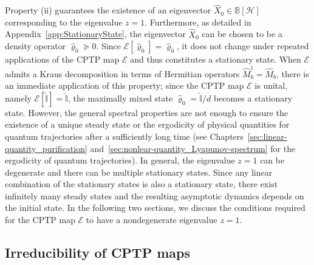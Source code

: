 \documentclass[preprint,pteplogo]{ptephy_v2}%
\numberwithin{equation}{section}
\theoremstyle{definition}
\newcommand{\mc}[1]{\mathcal{#1}}
\newcommand{\mbb}[1]{\mathbb{#1}}
\begin{document}
Property (ii) guarantees the existence of an eigenvector $\hat{X}_0 \in \mbb{B}[\mc{H}]$ corresponding to the eigenvalue $z=1$.
Furthermore, as detailed in Appendix~\ref{app:StationaryState}, the eigenvector $\hat{X}_0$ can be chosen to be a density operator $\hat{\varrho}_0 \succeq 0$. 
Since $\mc{E}[\hat{\varrho}_0]=\hat{\varrho}_0$, it does not change under repeated applications of the CPTP map $\mc{E}$ and thus constitutes a stationary state.
When $\mc{E}$ admits a Kraus decomposition in terms of Hermitian operators $\hat{M}_b^\dagger = \hat{M}_b$, there is an immediate application of this property; since the CPTP map $\mc{E}$ is unital, namely $\mc{E}[\hat{\mbb{I}}] = \hat{\mbb{I}}$, the maximally mixed state $\hat{\varrho}_0 = \hat{\mbb{I}}/d$ becomes a stationary state.
However, the general spectral properties are not enough to ensure the existence of a unique steady state or the ergodicity of physical quantities for quantum trajectories after a sufficiently long time (see Chapters~\ref{sec:linear-quantity_purification} and~\ref{sec:nonlear-quantity_Lyapunov-spectrum} for the ergodicity of quantum trajectories).
In general, the eigenvalue $z=1$ can be degenerate and there can be multiple stationary states. 
Since any linear combination of the stationary states is also a stationary state, there exist infinitely many steady states and the resulting asymptotic dynamics depends on the initial state.
In the following two sections, we discuss the conditions required for the CPTP map $\mc{E}$ to have a nondegenerate eigenvalue $z=1$.


\subsection{Irreducibility of CPTP maps}
\label{sec:irreducibility}
\end{document}
